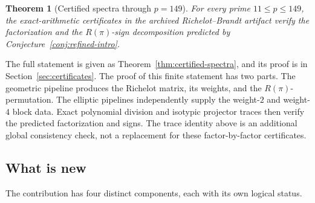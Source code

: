 \documentclass[10pt,a4paper]{amsart}
\newtheorem{theorem}{Theorem}[section]
\begin{document}
	
	\begin{theorem}[Certified spectra through $p=149$]\label{thm:certified-intro}
		For every prime $11\le p\le149$, the exact-arithmetic certificates in the
		archived Richelot--Brandt artifact verify the factorization and the
		$R(\pi)$-sign decomposition predicted by
		Conjecture~\ref{conj:refined-intro}.
	\end{theorem}
	
	The full statement is given as Theorem~\ref{thm:certified-spectra}, and its proof is in Section~\ref{sec:certificates}. The proof of this finite statement has two parts. The geometric pipeline produces the Richelot matrix, its weights, and the $R(\pi)$-permutation.
	The elliptic pipelines independently supply the weight-$2$ and weight-$4$
	block data. Exact polynomial division and isotypic projector traces then
	verify the predicted factorization and signs. The trace identity above is
	an additional global consistency check, not a replacement for these
	factor-by-factor certificates.
	
	\subsection{What is new}\label{ss:what-is-new}
	
	The contribution has four distinct components, each with its own logical
	status.
	
\end{document}
